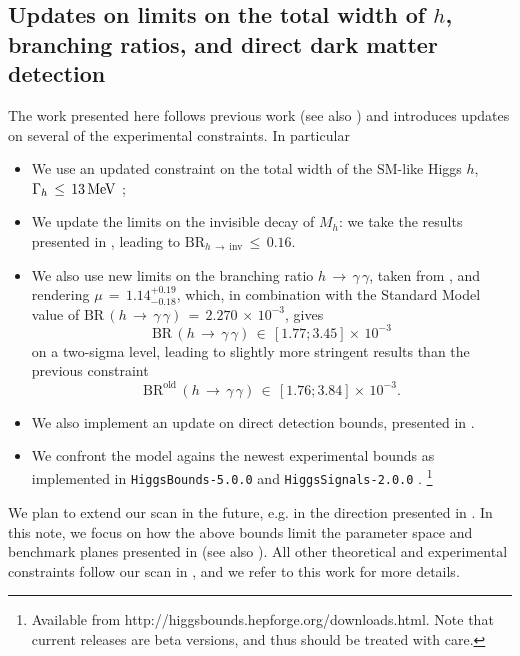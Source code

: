 \documentclass{PoS}
\newcommand{\MeV}{{\ensuremath\rm MeV}}
\newcommand{\eqn}{equation}
\begin{document}
{\subsection{Updates on limits on the total width of $h$, branching ratios, and direct dark matter detection}
The work presented here follows previous work   \cite{Ilnicka:2015jba} (see also \cite{Ilnicka:2015sra,Ilnicka:2015ova}) and introduces updates on several of the experimental constraints. In particular
\begin{itemize}
\item{}We use an updated constraint on the total width of the SM-like Higgs $h$, $\Gamma_h\,\leq\,13\,\MeV$ \cite{Khachatryan:2016ctc};
\item{}{We update the}  limits on the invisible decay of $M_h$: we take the results presented in \cite{Khachatryan:2016vau}, leading to $\text{BR}_{h\,\rightarrow\,\text{inv}}\,\leq\,0.16$.
\item{}{We also use} new limits on the branching ratio $h\,\rightarrow\,\gamma\,\gamma$, taken from \cite{Khachatryan:2016vau}, and rendering $\mu\,=\,1.14^{+0.19}_{-0.18}$, which, in combination with the Standard Model value \cite{deFlorian:2016spz} of $\text{BR}\,(h\,\rightarrow\,\gamma\,\gamma)\,=\,2.270\,\times\,10^{-3}$, {{gives}}
\begin{\eqn}\label{eq:rgaganew}
\text{BR}\,(h\,\rightarrow\,\gamma\,\gamma)\,\in\,\left[1.77;3.45\right]\times\,10^{-3}
\end{\eqn}
on a two-sigma level, {{leading to slightly more stringent results than }}the previous constraint \cite{Ilnicka:2015jba}
\begin{\eqn*}
\text{BR}^{\text{old}}\,(h\,\rightarrow\,\gamma\,\gamma)\,\in\,\left[1.76;3.84\right]\times\,10^{-3}.
\end{\eqn*}

\item{}We also implement an update on direct detection bounds, presented in \cite{Akerib:2016vxi}.
\item{} {We confront the model agains the newest experimental bounds as implemented in \texttt{HiggsBounds-5.0.0} {\cite{Bechtle:2008jh, Bechtle:2011sb, Bechtle:2013wla}} and \texttt{HiggsSignals-2.0.0} {\cite{Bechtle:2013xfa}}. \footnote{{Available from http://higgsbounds.hepforge.org/downloads.html.} Note that current release{s are} beta version{s}, and thus should be treated with care.}}

\end{itemize}
 {We plan to extend our scan in the future, e.g. in the direction presented in \cite{Belyaev:2016lok}. }  In this note, we focus on how the above bounds limit the parameter space and benchmark planes presented in \cite{Ilnicka:2015jba} (see also \cite{deFlorian:2016spz}). All other theoretical and experimental constraints follow our scan in \cite{Ilnicka:2015jba}, and we refer to this work for {more details}.

}
\end{document}
